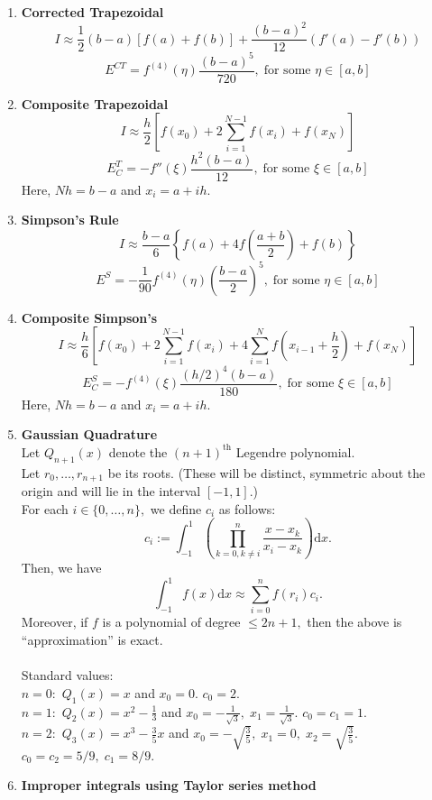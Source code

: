 \documentclass{article}
\begin{document}
\begin{enumerate}
	\item \textbf{Corrected Trapezoidal}
	\[I \approx \frac{1}{2}(b - a)[f(a) + f(b)] + \frac{(b - a)^2}{12}(f'(a) - f'(b))\]
	\[E^{CT} = f^{(4)}(\eta)\frac{(b - a)^5}{720},\;\text{for some }\eta\in[a, b]\]
	\item \textbf{Composite Trapezoidal}
	\[I \approx \frac{h}{2}\left[f(x_0) + 2\sum_{i=1}^{N-1}f(x_i) + f(x_N)\right]\]
	\[E_C^{T} = -f''(\xi)\frac{h^2(b-a)}{12},\;\text{for some }\xi\in[a, b]\]
	Here, $Nh = b-a$ and $x_i = a + ih.$\\
	\item \textbf{Simpson's Rule}
	\[I \approx \frac{b - a}{6}\left\{f(a) + 4f\left(\frac{a + b}{2}\right) + f(b)\right\}\]
	\[E^S = -\frac{1}{90}f^{(4)}(\eta)\left(\frac{b-a}{2}\right)^5,\;\text{for some }\eta\in[a, b]\]
	\item \textbf{Composite Simpson's}
	\[I \approx \frac{h}{6}[f(x_0) + 2\sum_{i=1}^{N-1}f(x_i) + 4\sum_{i=1}^{N}f\left(x_{i-1} + \frac{h}{2}\right) + f(x_N)]\]
	\[E_C^{S} = -f^{(4)}(\xi)\frac{(h/2)^4(b-a)}{180},\;\text{for some }\xi\in[a, b]\]
	Here, $Nh = b-a$ and $x_i = a + ih.$\\
	\item \textbf{Gaussian Quadrature}\\
	Let $Q_{n+1}(x)$ denote the $(n+1)^{\text{th}}$ Legendre polynomial.\\
	Let $r_0, \ldots, r_{n+1}$ be its roots. (These will be distinct, symmetric about the origin and will lie in the interval $[-1, 1].$)\\
	For each $i \in \{0, \ldots, n\},$ we define $c_i$ as follows:
	\[c_i := \int_{-1}^{1} \left(\prod_{k = 0, k \neq i}^{n}\frac{x - x_k}{x_i - x_k}\right) \text{d}x.\]
	Then, we have
	\[\int_{-1}^{1} f(x) \text{d}x \approx \displaystyle\sum_{i=0}^{n}f(r_i)c_i.\]
	Moreover, if $f$ is a polynomial of degree $\le 2n+1,$ then the above is ``approximation'' is exact.\\~\\
	Standard values: \\
	$n = 0:$ $Q_1(x) = x$ and $x_0 = 0.$ $c_0 = 2.$\\
	$n = 1:$ $Q_2(x) = x^2 - \frac{1}{3}$ and $x_0 = -\frac{1}{\sqrt{3}},\;x_1 = \frac{1}{\sqrt{3}}.$ $c_0 = c_1 = 1.$\\
	$n = 2:$ $Q_3(x) = x^3 - \frac{3}{5}x$ and $x_0 = -\sqrt{\frac{3}{5}},\;x_1 = 0,\; x_2 = \sqrt{\frac{3}{5}}.$ $c_0 = c_2 = 5/9,\;c_1 = 8/9.$
	\item \textbf{Improper integrals using Taylor series method}\\

\end{enumerate}
\end{document}
